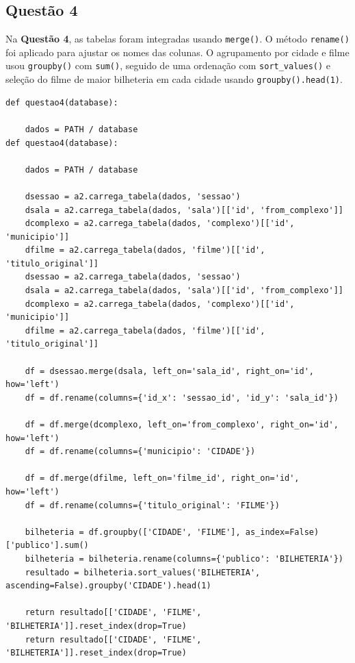 \documentclass{article}
\begin{document}
\subsection*{Questão 4}
Na \textbf{Questão 4}, as tabelas foram integradas usando \texttt{merge()}. O método \texttt{rename()} foi aplicado para ajustar os nomes das colunas. O agrupamento por cidade e filme usou \texttt{groupby()} com \texttt{sum()}, seguido de uma ordenação com \texttt{sort\_values()} e seleção do filme de maior bilheteria em cada cidade usando \texttt{groupby().head(1)}.
\linespread{1}
\begin{lstlisting}
def questao4(database):

    dados = PATH / database
def questao4(database):

    dados = PATH / database
    
    dsessao = a2.carrega_tabela(dados, 'sessao')
    dsala = a2.carrega_tabela(dados, 'sala')[['id', 'from_complexo']]
    dcomplexo = a2.carrega_tabela(dados, 'complexo')[['id', 'municipio']]
    dfilme = a2.carrega_tabela(dados, 'filme')[['id', 'titulo_original']]
    dsessao = a2.carrega_tabela(dados, 'sessao')
    dsala = a2.carrega_tabela(dados, 'sala')[['id', 'from_complexo']]
    dcomplexo = a2.carrega_tabela(dados, 'complexo')[['id', 'municipio']]
    dfilme = a2.carrega_tabela(dados, 'filme')[['id', 'titulo_original']]

    df = dsessao.merge(dsala, left_on='sala_id', right_on='id', how='left')
    df = df.rename(columns={'id_x': 'sessao_id', 'id_y': 'sala_id'})  

    df = df.merge(dcomplexo, left_on='from_complexo', right_on='id', how='left')
    df = df.rename(columns={'municipio': 'CIDADE'})
    
    df = df.merge(dfilme, left_on='filme_id', right_on='id', how='left')
    df = df.rename(columns={'titulo_original': 'FILME'})

    bilheteria = df.groupby(['CIDADE', 'FILME'], as_index=False)['publico'].sum()
    bilheteria = bilheteria.rename(columns={'publico': 'BILHETERIA'})
    resultado = bilheteria.sort_values('BILHETERIA', ascending=False).groupby('CIDADE').head(1)

    return resultado[['CIDADE', 'FILME', 'BILHETERIA']].reset_index(drop=True)
    return resultado[['CIDADE', 'FILME', 'BILHETERIA']].reset_index(drop=True)

\end{lstlisting}
\end{document}
